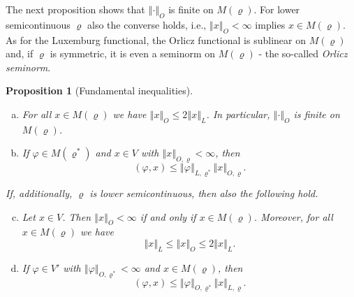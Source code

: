 \documentclass[a4paper,11pt,reqno]{amsart}
\newtheorem{proposition}[lemma]{Proposition}
\theoremstyle{definition}
\numberwithin{equation}{section}
\newcommand{\vr}{{\varrho}}
\newcommand{\av}[1]{\left\Vert #1\right\Vert}
\newcommand{\1}{\mathds{1}}
\begin{document}
The next proposition shows that $\av{\cdot}_O$ is finite on $M(\vr)$. For lower semicontinuous $\vr$ also the converse holds, i.e., $\av{x}_O < \infty$   implies $x \in M(\vr)$.   As for the Luxemburg functional, the Orlicz functional is sublinear on $M(\vr)$ and, if $\vr$ is symmetric, it is even a seminorm on $M(\vr)$  -  the so-called {\em Orlicz seminorm}.






\begin{proposition}[Fundamental inequalities]\label{proposition:fundamental inequalities}

 \begin{enumerate}[(a)]
  
  \item For all $x \in M(\vr)$ we have $\av{x}_O \leq 2\av{x}_L$. In particular, $\av{\cdot}_O$ is finite on $M(\vr)$. 
  
  \item If $\varphi \in M(\vr^*)$ and $x \in V$ with $\av{x}_{O,\vr} < \infty$, then 
  $$(\varphi,x) \leq \av{\varphi}_{L,\vr^*} \av{x}_{O,\vr}.$$
  \end{enumerate}
  If, additionally, $\vr$ is lower semicontinuous, then also the following hold.
  \begin{enumerate}[(a)] \setcounter{enumi}{2}
   
   \item Let $x \in V$. Then $\av{x}_O < \infty$ if and only if $x \in M(\vr)$. Moreover, for all $x \in M(\vr)$ we have $$\av{x}_L \leq \av{x}_O \leq 2\av{x}_L.$$
  
  \item  If $\varphi \in V'$ with $\av{\varphi}_{O,\vr^*} < \infty$ and $x \in M(\vr)$, then 
  $$(\varphi,x) \leq \av{\varphi}_{O,\vr^*} \av{x}_{L,\vr}.$$
 \end{enumerate}



\end{proposition}
\end{document}
